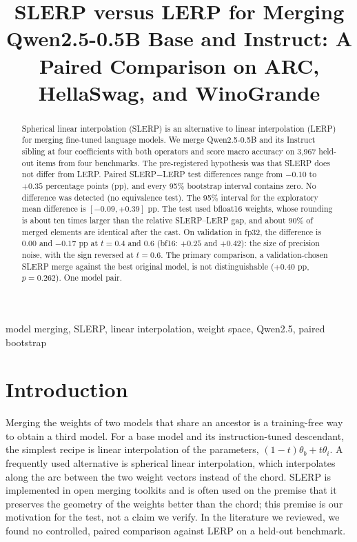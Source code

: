 \documentclass[conference]{IEEEtran}
\begin{document}
\title{SLERP versus LERP for Merging Qwen2.5-0.5B Base and Instruct: A Paired Comparison on ARC, HellaSwag, and WinoGrande}

\author{
}

\maketitle

\begin{abstract}
Spherical linear interpolation (SLERP) is an alternative to linear interpolation (LERP) for merging fine-tuned language models. We merge Qwen2.5-0.5B and its Instruct sibling at four coefficients with both operators and score macro accuracy on 3{,}967 held-out items from four benchmarks. The pre-registered hypothesis was that SLERP does not differ from LERP. Paired SLERP$-$LERP test differences range from $-0.10$ to $+0.35$ percentage points (pp), and every 95\% bootstrap interval contains zero. No difference was detected (no equivalence test). The 95\% interval for the exploratory mean difference is $[-0.09,+0.39]$ pp. The test used bfloat16 weights, whose rounding is about ten times larger than the relative SLERP--LERP gap, and about 90\% of merged elements are identical after the cast. On validation in fp32, the difference is $0.00$ and $-0.17$ pp at $t=0.4$ and $0.6$ (bf16: $+0.25$ and $+0.42$): the size of precision noise, with the sign reversed at $t=0.6$. The primary comparison, a validation-chosen SLERP merge against the best original model, is not distinguishable ($+0.40$ pp, $p=0.262$). One model pair.
\end{abstract}

\begin{IEEEkeywords}
model merging, SLERP, linear interpolation, weight space, Qwen2.5, paired bootstrap
\end{IEEEkeywords}

\section{Introduction}
Merging the weights of two models that share an ancestor is a training-free way to obtain a third model. For a base model and its instruction-tuned descendant, the simplest recipe is linear interpolation of the parameters, $(1-t)\theta_b+t\theta_i$. A frequently used alternative is spherical linear interpolation, which interpolates along the arc between the two weight vectors instead of the chord. SLERP is implemented in open merging toolkits \cite{goddard2024mergekit} and is often used on the premise that it preserves the geometry of the weights better than the chord; this premise is our motivation for the test, not a claim we verify. In the literature we reviewed, we found no controlled, paired comparison against LERP on a held-out benchmark.
\end{document}
